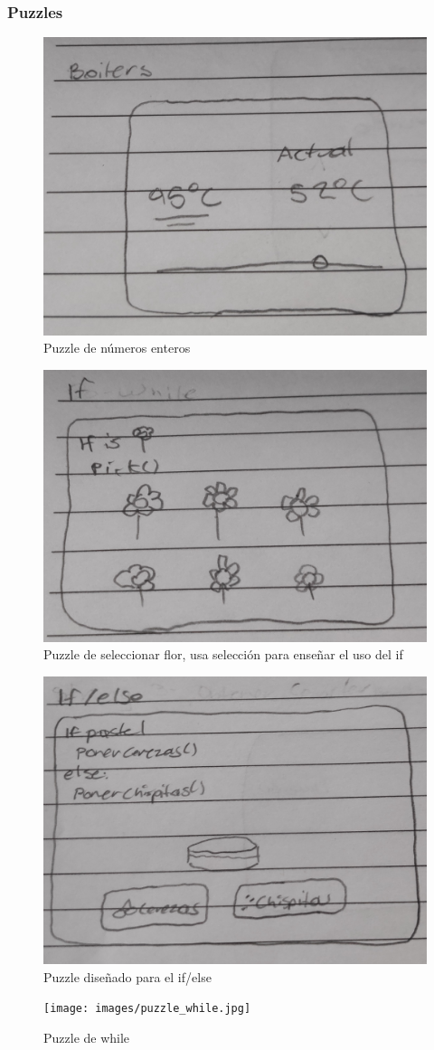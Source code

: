 \subsubsection{Puzzles}
\begin{figure}[p]
    \centering
    \includegraphics[width=0.5\linewidth]{images/boilers_puzzle.jpg}
    \caption{Puzzle de números enteros}
    \label{fig:puzzle_enteros_boiler}
\end{figure}
\begin{figure}[p]
    \centering
    \includegraphics[width=0.5\linewidth]{images/if_puzzle.jpg}
    \caption{Puzzle de seleccionar flor, usa selección para enseñar el uso del if}
    \label{fig:puzzle_if}
\end{figure}
\begin{figure}[p]
    \centering
    \includegraphics[width=0.5\linewidth]{images/if_else_puzzle.jpg}
    \caption{Puzzle diseñado para el if/else}
    \label{fig:if_else_puzzle}
\end{figure}

\begin{figure}[p]
    \centering
    \texttt{[image: images/puzzle\_while.jpg]}
    \caption{Puzzle de while}
    \label{fig:while_puzzle}
\end{figure}


